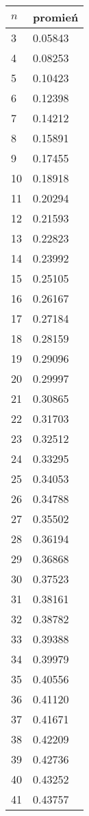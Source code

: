 \documentclass{article}
\begin{document}
\begin{table}[H]
\centering
\begin{tabular}{|l|l|}
\hline
$n$ & promień \\ \hline
3 & 0.05843 \\ \hline
4 & 0.08253 \\ \hline
5 & 0.10423 \\ \hline
6 & 0.12398 \\ \hline
7 & 0.14212 \\ \hline
8 & 0.15891 \\ \hline
9 & 0.17455 \\ \hline
10 & 0.18918 \\ \hline
11 & 0.20294 \\ \hline
12 & 0.21593 \\ \hline
13 & 0.22823 \\ \hline
14 & 0.23992 \\ \hline
15 & 0.25105 \\ \hline
16 & 0.26167 \\ \hline
17 & 0.27184 \\ \hline
18 & 0.28159 \\ \hline
19 & 0.29096 \\ \hline
20 & 0.29997 \\ \hline
21 & 0.30865 \\ \hline
22 & 0.31703 \\ \hline
23 & 0.32512 \\ \hline
24 & 0.33295 \\ \hline
25 & 0.34053 \\ \hline
26 & 0.34788 \\ \hline
27 & 0.35502 \\ \hline
28 & 0.36194 \\ \hline
29 & 0.36868 \\ \hline
30 & 0.37523 \\ \hline
31 & 0.38161 \\ \hline
32 & 0.38782 \\ \hline
33 & 0.39388 \\ \hline
34 & 0.39979 \\ \hline
35 & 0.40556 \\ \hline
36 & 0.41120 \\ \hline
37 & 0.41671 \\ \hline
38 & 0.42209 \\ \hline
39 & 0.42736 \\ \hline
40 & 0.43252 \\ \hline
41 & 0.43757 \\ \hline

\end{tabular}
\end{table}
\end{document}
